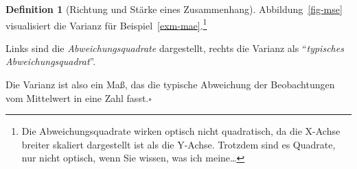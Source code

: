\documentclass[
  a4paper,
  DIV=11]{scrreprt}
\theoremstyle{definition}
\theoremstyle{definition}
\theoremstyle{definition}
\newtheorem{definition}{Definition}[chapter]
\theoremstyle{remark}
\begin{document}
\begin{definition}[Richtung und Stärke eines
Zusammenhang]
Abbildung~\ref{fig-mse} visualisiert die Varianz für
Beispiel~\ref{exm-mae}.\footnote{Die Abweichungsquadrate wirken optisch
  nicht quadratisch, da die X-Achse breiter skaliert dargestellt ist als
  die Y-Achse. Trotzdem sind es Quadrate, nur nicht optisch, wenn Sie
  wissen, was ich meine\ldots{}}

Links sind die \emph{Abweichungsquadrate} dargestellt, rechts die
Varianz als ``\emph{typisches Abweichungsquadrat}''.

\begin{tcolorbox}[enhanced jigsaw, leftrule=.75mm, opacitybacktitle=0.6, colback=white, colframe=quarto-callout-note-color-frame, coltitle=black, colbacktitle=quarto-callout-note-color!10!white, opacityback=0, left=2mm, breakable, titlerule=0mm, toptitle=1mm, bottomtitle=1mm, rightrule=.15mm, title=\textcolor{quarto-callout-note-color}{\faInfo}\hspace{0.5em}{Hinweis}, arc=.35mm, bottomrule=.15mm, toprule=.15mm]

Die Varianz ist also ein Maß, das die typische Abweichung der
Beobachtungen vom Mittelwert in eine Zahl fasst.\(\square\)

\end{tcolorbox}

\begin{figure}

\begin{minipage}{0.50\linewidth}



\end{minipage}%
%
\begin{minipage}{0.50\linewidth}


\end{minipage}
\end{figure}
\end{definition}
\end{document}
